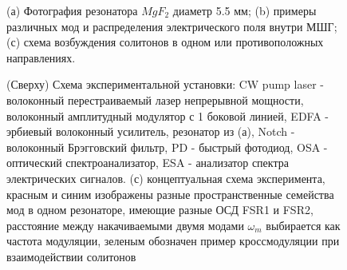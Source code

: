 
\begin{figure}[ht]
\begin{minipage}[ht]{1\linewidth}
\end{minipage}
\caption{(а) Фотография резонатора $MgF_2$ диаметр 5.5 мм; (b) примеры различных мод и распределения электрического поля внутри МШГ; (с) схема возбуждения солитонов в одном или противоположных направлениях.}
\label{Figure1_V1_c}
\end{figure}

\begin{figure}[ht]
\begin{minipage}[ht]{1\linewidth}
\end{minipage}
\caption{(Сверху) Схема экспериментальной установки: CW pump laser - волоконный перестраиваемый лазер непрерывной мощности, волоконный амплитудный модулятор с 1 боковой линией, EDFA - эрбиевый волоконный усилитель, резонатор из (а), Notch - волоконный Брэгговский фильтр, PD - быстрый фотодиод, OSA - оптический спектроанализатор, ESA - анализатор спектра электрических сигналов. (с) концептуальная схема эксперимента, красным и синим изображены разные пространственные семейства мод в одном резонаторе, имеющие разные ОСД FSR1 и FSR2, расстояние между накачиваемыми двумя модами $\omega_m$ выбирается как частота модуляции, зеленым обозначен пример кроссмодуляции при взаимодействии солитонов}
\label{Figure1_V1_c}
\end{figure}


